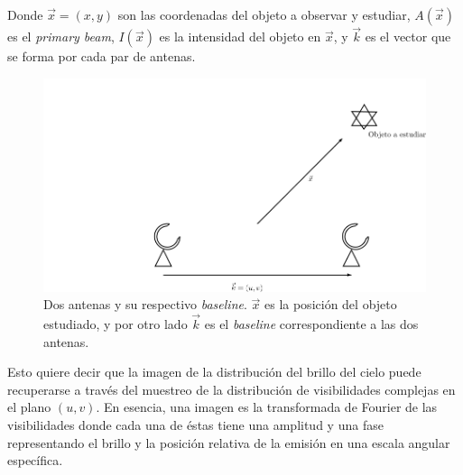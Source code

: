 Donde $\vec{x} = (x,y)$ son las coordenadas del objeto a observar y estudiar, $A(\vec{x})$ es el \textit{primary beam}, $I(\vec{x})$ es la intensidad del objeto en $\vec{x}$, y $\vec{k}$ es el vector que se forma por cada par de antenas. 

\begin{figure}[h!]
\centering
\includegraphics[scale=0.4]{images/antenas.png}
\caption{Dos antenas y su respectivo \textit{baseline}. $\vec{x}$ es la posición del objeto estudiado, y por otro lado $\vec{k}$ es el \textit{baseline} correspondiente a las dos antenas.}
\label{fig:antena}
\end{figure}

Esto quiere decir que la imagen de la distribución del brillo del cielo puede recuperarse a través del muestreo de la distribución de visibilidades complejas en el plano $(u,v)$. En esencia, una imagen es la transformada de Fourier de las visibilidades donde cada una de éstas tiene una amplitud y una fase representando el brillo y la posición relativa de la emisión en una escala angular específica.



